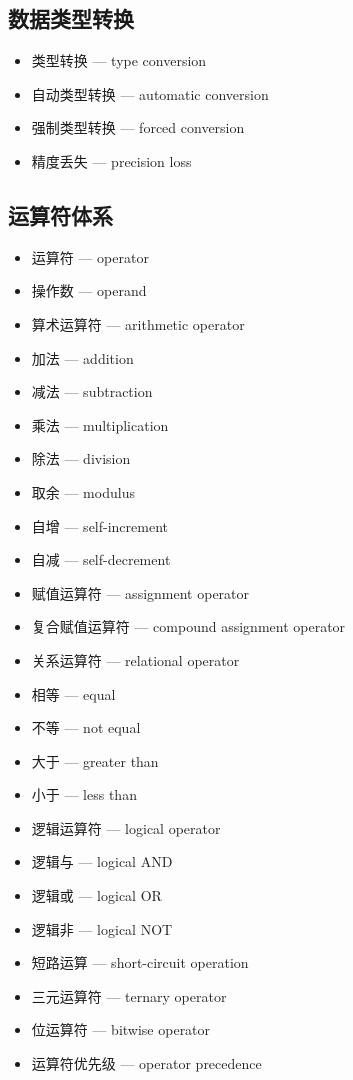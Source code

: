 \subsection{数据类型转换}
\begin{itemize}
\item 类型转换 — type conversion
\item 自动类型转换 — automatic conversion
\item 强制类型转换 — forced conversion
\item 精度丢失 — precision loss
\end{itemize}

\subsection{运算符体系}
\begin{itemize}
\item 运算符 — operator
\item 操作数 — operand
\item 算术运算符 — arithmetic operator
\item 加法 — addition
\item 减法 — subtraction
\item 乘法 — multiplication
\item 除法 — division
\item 取余 — modulus
\item 自增 — self-increment
\item 自减 — self-decrement
\item 赋值运算符 — assignment operator
\item 复合赋值运算符 — compound assignment operator
\item 关系运算符 — relational operator
\item 相等 — equal
\item 不等 — not equal
\item 大于 — greater than
\item 小于 — less than
\item 逻辑运算符 — logical operator
\item 逻辑与 — logical AND
\item 逻辑或 — logical OR
\item 逻辑非 — logical NOT
\item 短路运算 — short-circuit operation
\item 三元运算符 — ternary operator
\item 位运算符 — bitwise operator
\item 运算符优先级 — operator precedence
\end{itemize}

